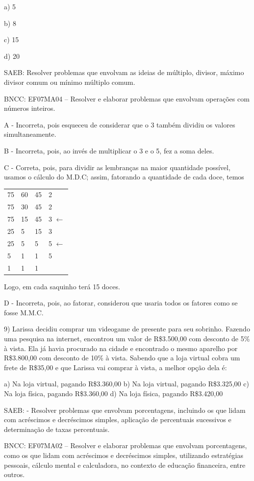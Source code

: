 a) 5

b) 8

c) 15

d) 20

SAEB: Resolver problemas que envolvam as ideias de múltiplo, divisor,
máximo divisor comum ou mínimo múltiplo comum.

BNCC: EF07MA04 -- Resolver e elaborar problemas que envolvam operações
com números inteiros.

A - Incorreta, pois esqueceu de considerar que o 3 também dividiu os
valores simultaneamente.

B - Incorreta, pois, ao invés de multiplicar o 3 e o 5, fez a soma
deles.

C - Correta, pois, para dividir as lembranças na maior quantidade
possível, usamos o cálculo do M.D.C; assim, fatorando a quantidade de
cada doce, temos

\begin{longtable}[]{@{}llll@{}}
\toprule
\endhead
75 & 60 & 45 & 2\tabularnewline
75 & 30 & 45 & 2\tabularnewline
75 & 15 & 45 & 3 \(\leftarrow\)\tabularnewline
25 & 5 & 15 & 3\tabularnewline
25 & 5 & 5 & 5 \(\leftarrow\)\tabularnewline
5 & 1 & 1 & 5\tabularnewline
1 & 1 & 1 &\tabularnewline
\bottomrule
\end{longtable}

Logo, em cada saquinho terá 15 doces.

D - Incorreta, pois, ao fatorar, considerou que usaria todos os fatores
como se fosse M.M.C.

9) Larissa decidiu comprar um videogame de presente para seu sobrinho.
Fazendo uma pesquisa na internet, encontrou um valor de R\$3.500,00 com
desconto de 5\% à vista. Ela já havia procurado na cidade e encontrado o
mesmo aparelho por R\$3.800,00 com desconto de 10\% à vista. Sabendo que
a loja virtual cobra um frete de R\$35,00 e que Larissa vai comprar à
vista, a melhor opção dela é:

a) Na loja virtual, pagando R\$3.360,00 b) Na loja virtual, pagando
R\$3.325,00 c) Na loja física, pagando R\$3.360,00 d) Na loja física,
pagando R\$3.420,00

SAEB: - Resolver problemas que envolvam porcentagens, incluindo os que
lidam com acréscimos e decréscimos simples, aplicação de percentuais
sucessivos e determinação de taxas percentuais.

BNCC: EF07MA02 -- Resolver e elaborar problemas que envolvam
porcentagens, como os que lidam com acréscimos e decréscimos simples,
utilizando estratégias pessoais, cálculo mental e calculadora, no
contexto de educação financeira, entre outros.

